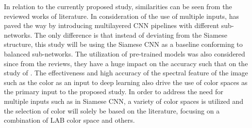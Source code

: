  In relation to the currently proposed study, similarities can be seen from the reviewed works of literature. In consideration of the use of multiple inputs, \cite{al-sarayreh-2018, martinel-2018, pandey-2017} has paved the way by introducing multilayered CNN pipelines with different sub-networks. The only difference is that instead of deviating from the Siamese structure, this study will be using the Siamese CNN as a baseline conforming to balanced sub-networks. The utilization of pre-trained models was also considered since from the reviews, they have a huge impact on the accuracy such that on the study of \cite{al-sarayreh-2018,martinel-2018,vijayakumari-2022}. The effectiveness and high accuracy of the spectral feature \cite{al-sarayreh-2018} of the image such as the color as an input to deep learning also drive the use of color spaces as the primary input to the proposed study. In order to address the need for multiple inputs such as in Siamese CNN, a variety of color spaces is utilized and the selection of color will solely be based on the literature, focusing on a combination of LAB color space and others. 